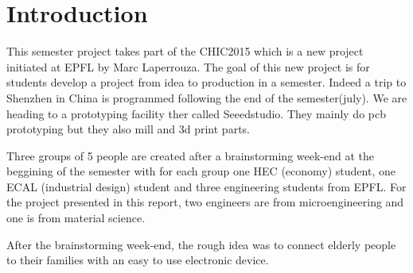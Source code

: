 \section{Introduction}

This semester project takes part of the CHIC2015 which is a new project initiated at EPFL by Marc Laperrouza. The goal of this new project is for students develop a project from idea to production in a semester. Indeed a trip to Shenzhen in China is programmed following the end of the semester(july). We are heading to a prototyping facility ther called Seeedstudio. They mainly do pcb prototyping but they also mill and 3d print parts.

Three groups of 5 people are created after a brainstorming week-end at the beggining of the semester with for each group one HEC (economy) student, one ECAL (industrial design) student and three engineering students from EPFL. For the project presented in this report, two engineers are from microengineering and one is from material science.

After the brainstorming week-end, the rough idea was to connect elderly people to their families with an easy to use electronic device.
